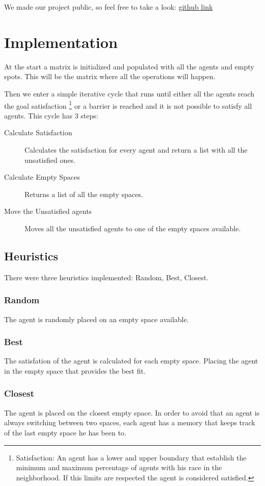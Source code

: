 \documentclass[a4paper,titlepage,11pt]{article}
\begin{document}
We made our project public, so feel free to take a look:
\href{https://github.com/BCasaleiro/schelling-model-segregation}{github link}

\newpage

\section{Implementation}
At the start a matrix is initialized and populated with all the agents and empty spots.
This will be the matrix where all the operations will happen.

Then we enter a simple iterative cycle that runs until either all the agents reach the goal satisfaction
\footnote{Satisfaction: An agent has a lower and upper boundary that establish the minimum and maximum
percentage of agents with his race in the neighborhood. If this limits are respected the agent is considered
satisfied.}
or a barrier is reached and it is not possible to satisfy all agents.
This cycle has 3 steps:

\begin{description}
\item [ Calculate Satisfaction ] Calculates the satisfaction for every agent and return a list with all the unsatisfied ones.
\item [ Calculate Empty Spaces ] Returns a list of all the empty spaces.
\item [ Move the Unsatisfied agents ] Moves all the unsatisfied agents to one of the empty spaces available.
\end{description}

\subsection{Heuristics}
There were three heuristics implemented: Random, Best, Closest.

\subsubsection{Random}
The agent is randomly placed on an empty space available.

\subsubsection{Best}
The satisfation of the agent is calculated for each empty space.
Placing the agent in the empty space that provides the best fit.

\subsubsection{Closest}
The agent is placed on the closest empty space.
In order to avoid that an agent is always switching between two spaces,
each agent has a memory that keeps track of the last empty space he has been to.
\end{document}
